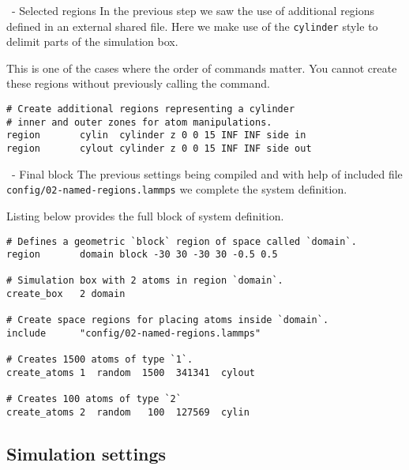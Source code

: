 \begin{frame}[fragile]{\secname}{\subsecname\ - Selected regions}
In the previous step we saw the use of additional regions defined in an external shared file. Here we make use of the \Verb|cylinder| style to delimit parts of the simulation box.

\vspace{0.5cm}

This is one of the cases where the order of commands matter. You cannot create these regions without previously calling the  command.

\vspace{0.5cm}

\begin{lstlisting}[language=LAMMPS]
# Create additional regions representing a cylinder
# inner and outer zones for atom manipulations.
region       cylin  cylinder z 0 0 15 INF INF side in
region       cylout cylinder z 0 0 15 INF INF side out
\end{lstlisting}
\end{frame}

\begin{frame}[fragile]{\secname}{\subsecname\ - Final block}
The previous settings being compiled and with help of included file \Verb|config/02-named-regions.lammps| we complete the system definition.

\vspace{0.5cm}
Listing below provides the full block of system definition.
\vspace{0.5cm}

\begin{lstlisting}[language=LAMMPS,basicstyle=\tiny]
# Defines a geometric `block` region of space called `domain`.
region       domain block -30 30 -30 30 -0.5 0.5

# Simulation box with 2 atoms in region `domain`.
create_box   2 domain

# Create space regions for placing atoms inside `domain`.
include      "config/02-named-regions.lammps"

# Creates 1500 atoms of type `1`.
create_atoms 1  random  1500  341341  cylout

# Creates 100 atoms of type `2`
create_atoms 2  random   100  127569  cylin
\end{lstlisting}
\end{frame}

\subsection{Simulation settings}

